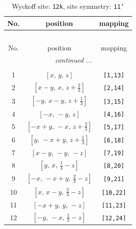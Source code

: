 \documentclass[fleqn,8pt]{jsarticle}
\begin{document}
\renewcommand{\arraystretch}{1.2}
\begin{longtable}{ccc}
\caption{Wyckoff site: {\tt 12k}, site symmetry: {\tt 11'}}
 \\
 \hline \hline
No. & position & mapping \\ \hline \endfirsthead

\multicolumn{2}{l}{\tablename\ \thetable{}} \\
 \hline \hline
No. & position & mapping \\ \hline \endhead

 \hline \hline
\multicolumn{2}{r}{\footnotesize\it continued ...} \\ \endfoot

 \hline \hline
\multicolumn{2}{r}{} \\ \endlastfoot

1 & $\left[ x,\, y,\, z \right]$ & {\tt [1,13]} \\ \hline
2 & $\left[ x - y,\, x,\, z + \frac{2}{3} \right]$ & {\tt [2,14]} \\ \hline
3 & $\left[ - y,\, x - y,\, z + \frac{1}{3} \right]$ & {\tt [3,15]} \\ \hline
4 & $\left[ - x,\, - y,\, z \right]$ & {\tt [4,16]} \\ \hline
5 & $\left[ - x + y,\, - x,\, z + \frac{2}{3} \right]$ & {\tt [5,17]} \\ \hline
6 & $\left[ y,\, - x + y,\, z + \frac{1}{3} \right]$ & {\tt [6,18]} \\ \hline
7 & $\left[ x - y,\, - y,\, - z \right]$ & {\tt [7,19]} \\ \hline
8 & $\left[ y,\, x,\, \frac{1}{3} - z \right]$ & {\tt [8,20]} \\ \hline
9 & $\left[ - x,\, - x + y,\, \frac{2}{3} - z \right]$ & {\tt [9,21]} \\ \hline
10 & $\left[ x,\, x - y,\, \frac{2}{3} - z \right]$ & {\tt [10,22]} \\ \hline
11 & $\left[ - x + y,\, y,\, - z \right]$ & {\tt [11,23]} \\ \hline
12 & $\left[ - y,\, - x,\, \frac{1}{3} - z \right]$ & {\tt [12,24]} \\
\end{longtable}
\end{document}
